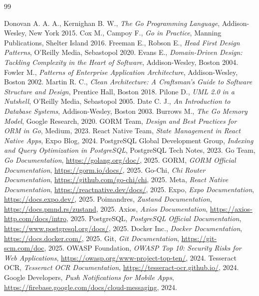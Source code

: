 \documentclass[12pt,fleqn,twoside,openany]{book} %
\begin{document}
\pagestyle{plain}
\begin{thebibliography}{99}

 Donovan A. A. A., Kernighan B. W., \textit{The Go Programming Language}, Addison-Wesley, New York 2015.
 Cox M., Campoy F., \textit{Go in Practice}, Manning Publications, Shelter Island 2016.
 Freeman E., Robson E., \textit{Head First Design Patterns}, O'Reilly Media, Sebastopol 2020.
 Evans E., \textit{Domain-Driven Design: Tackling Complexity in the Heart of Software}, Addison-Wesley, Boston 2004.
 Fowler M., \textit{Patterns of Enterprise Application Architecture}, Addison-Wesley, Boston 2002.
 Martin R. C., \textit{Clean Architecture: A Craftsman's Guide to Software Structure and Design}, Prentice Hall, Boston 2018.
 Pilone D., \textit{UML 2.0 in a Nutshell}, O'Reilly Media, Sebastopol 2005.
 Date C. J., \textit{An Introduction to Database Systems}, Addison-Wesley, Boston 2003.
 Burrows M., \textit{The Go Memory Model}, Google Research, 2020.
 GORM Team, \textit{Design and Best Practices for ORM in Go}, Medium, 2023.
 React Native Team, \textit{State Management in React Native Apps}, Expo Blog, 2024.
 PostgreSQL Global Development Group, \textit{Indexing and Query Optimization in PostgreSQL}, PostgreSQL Tech Notes, 2023.
 Go Team, \textit{Go Documentation}, \url{https://golang.org/doc/}, 2025.
 GORM, \textit{GORM Official Documentation}, \url{https://gorm.io/docs/}, 2025.
 Go-Chi, \textit{Chi Router Documentation}, \url{https://github.com/go-chi/chi}, 2025.
 Meta, \textit{React Native Documentation}, \url{https://reactnative.dev/docs/}, 2025.
 Expo, \textit{Expo Documentation}, \url{https://docs.expo.dev/}, 2025.
 Poimandres, \textit{Zustand Documentation}, \url{https://docs.pmnd.rs/zustand}, 2025.
 Axios, \textit{Axios Documentation}, \url{https://axios-http.com/docs/intro}, 2025.
 PostgreSQL, \textit{PostgreSQL Official Documentation}, \url{https://www.postgresql.org/docs/}, 2025.
 Docker Inc., \textit{Docker Documentation}, \url{https://docs.docker.com/}, 2025.
 Git, \textit{Git Documentation}, \url{https://git-scm.com/doc}, 2025.
 OWASP Foundation, \textit{OWASP Top 10: Security Risks for Web Applications}, \url{https://owasp.org/www-project-top-ten/}, 2024.
 Tesseract OCR, \textit{Tesseract OCR Documentation}, \url{https://tesseract-ocr.github.io/}, 2024.
 Google Developers, \textit{Push Notifications for Mobile Apps}, \url{https://firebase.google.com/docs/cloud-messaging}, 2024.

\end{thebibliography}

\end{document}
